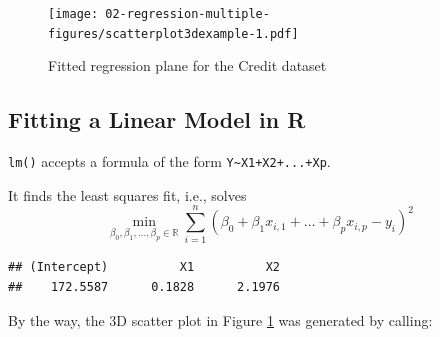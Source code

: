 \documentclass[10pt,b5paper,krantz1]{krantz}
\newenvironment{Shaded}{\begin{snugshade}}{\end{snugshade}}
\newcommand{\CommentTok}[1]{\textcolor[rgb]{0.37,0.37,0.37}{\textit{#1}}}
\newcommand{\DataTypeTok}[1]{\textcolor[rgb]{0.27,0.27,0.27}{#1}}
\newcommand{\DecValTok}[1]{\textcolor[rgb]{0.06,0.06,0.06}{#1}}
\newcommand{\KeywordTok}[1]{\textcolor[rgb]{0.27,0.27,0.27}{\textbf{#1}}}
\newcommand{\NormalTok}[1]{#1}
\newcommand{\OperatorTok}[1]{\textcolor[rgb]{0.43,0.43,0.43}{\textbf{#1}}}
\newcommand{\OtherTok}[1]{\textcolor[rgb]{0.37,0.37,0.37}{#1}}
\newcommand{\StringTok}[1]{\textcolor[rgb]{0.5,0.5,0.5}{#1}}
\begin{document}
\begin{figure}
\hypertarget{fig:scatterplot3dexample}{%
\centering
\texttt{[image: 02-regression-multiple-figures/scatterplot3dexample-1.pdf]}
\caption{Fitted regression plane for the Credit dataset}\label{fig:scatterplot3dexample}
}
\end{figure}

\hypertarget{fitting-a-linear-model-in-r}{%
\subsection{Fitting a Linear Model in R}\label{fitting-a-linear-model-in-r}}

\texttt{lm()} accepts a formula of the form \texttt{Y\textasciitilde{}X1+X2+...+Xp}.

It finds the least squares fit, i.e., solves
\[
\min_{\beta_0, \beta_1,\dots, \beta_p\in\mathbb{R}}
\sum_{i=1}^n \left( \beta_0 + \beta_1 x_{i,1}+\dots+\beta_p x_{i,p} - y_i \right) ^2
\]

\begin{Shaded}
\end{Shaded}

\begin{verbatim}
## (Intercept)          X1          X2 
##    172.5587      0.1828      2.1976
\end{verbatim}

By the way, the 3D scatter plot in Figure \ref{fig:scatterplot3dexample}
was generated by calling:

\begin{Shaded}
\end{Shaded}
\end{document}
